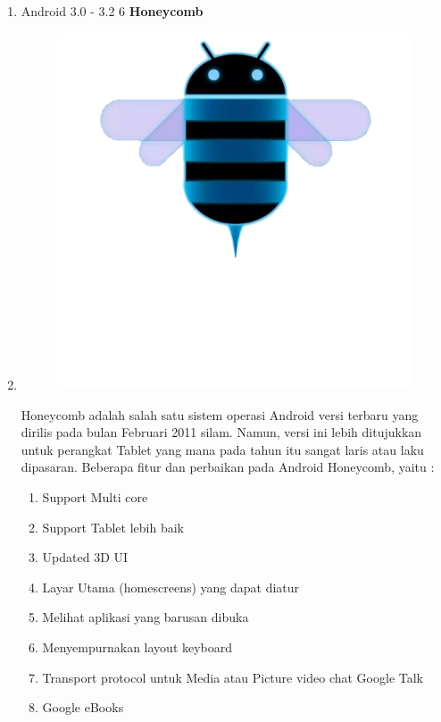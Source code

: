 \begin{enumerate}
\item Android 3.0 - 3.2 6 \textbf{Honeycomb}\\
\item \begin{figure}[]
    \centering
    \includegraphics[scale=0.1]{pictures/android-honeycomb.png}
    \caption{}
    \label{}
\end{figure}
Honeycomb adalah salah satu sistem operasi Android versi terbaru yang dirilis pada bulan Februari 2011 silam. Namun, versi ini lebih ditujukkan untuk perangkat Tablet yang mana pada tahun itu sangat laris atau laku dipasaran. Beberapa fitur dan perbaikan pada Android Honeycomb, yaitu :
\begin{enumerate}
    \item Support Multi core
    \item Support Tablet lebih baik
    \item Updated 3D UI
    \item Layar Utama (homescreens) yang dapat diatur
    \item Melihat aplikasi yang barusan dibuka
    \item Menyempurnakan layout keyboard
    \item Transport protocol untuk Media atau Picture video chat Google Talk
    \item Google eBooks

\end{enumerate}
\end{enumerate}
